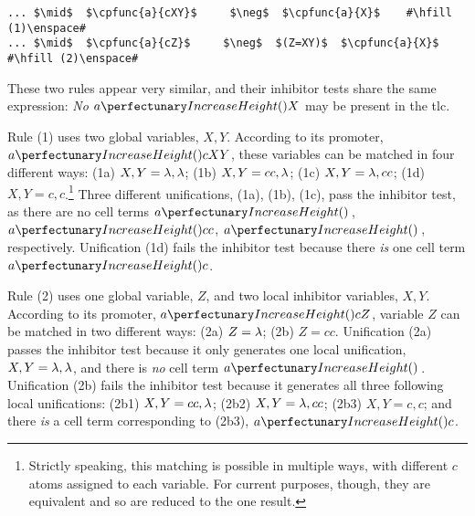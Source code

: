 \lstset{xleftmargin=.5in, xrightmargin=.5in} 
\begin{lstlisting}
... $\mid$  $\cpfunc{a}{cXY}$     $\neg$  $\cpfunc{a}{X}$    #\hfill (1)\enspace#
... $\mid$  $\cpfunc{a}{cZ}$     $\neg$  $(Z=XY)$  $\cpfunc{a}{X}$    #\hfill (2)\enspace#
\end{lstlisting}

These two rules appear very similar, and their \gls{inhibitor} tests share the same expression: 
\emph{No} \(\cpfunc{a}{X}\) may be present in the \gls{tlc}.

Rule (1) uses two global variables, \(X, Y\). 
According to its \gls{promoter}, \(\cpfunc{a}{cXY}\), these variables can be matched in four different ways:
(1a) \(X, Y = \lambda, \lambda\); (1b) \(X, Y = cc, \lambda\); (1c) \(X, Y = \lambda, cc\); (1d) \(X, Y = c, c\).\footnote{Strictly speaking, this matching is possible in multiple ways, with different \(c\) atoms assigned to each variable.  For current purposes, though, they are equivalent and so are reduced to the one result.}
Three different unifications, (1a), (1b), (1c), pass the \gls{inhibitor} test, 
as there are no cell terms \(\cpfunc{a}{\,}\), \(\cpfunc{a}{cc}\), \(\cpfunc{a}{\,}\), respectively. 
Unification (1d) fails the \gls{inhibitor} test because there \emph{is} one cell term \(\cpfunc{a}{c}\).

Rule (2) uses one global variable, \(Z\), and two local \gls{inhibitor} variables, \(X, Y\).
According to its \gls{promoter}, \(\cpfunc{a}{cZ}\), variable \(Z\) can be matched in two different ways: 
(2a) \(Z = \lambda\); (2b) \(Z = cc\).
Unification (2a) passes the \gls{inhibitor} test because it only generates one local unification,
\(X, Y = \lambda, \lambda\), and there is \emph{no} cell term \(\cpfunc{a}{\,}\).
Unification (2b) fails the \gls{inhibitor} test because it generates all three following local unifications:
(2b1) \(X, Y = cc, \lambda\); (2b2) \(X, Y = \lambda, cc\); (2b3) \(X, Y = c, c\); 
and there \emph{is} a cell term corresponding to (2b3), \(\cpfunc{a}{c}\).

